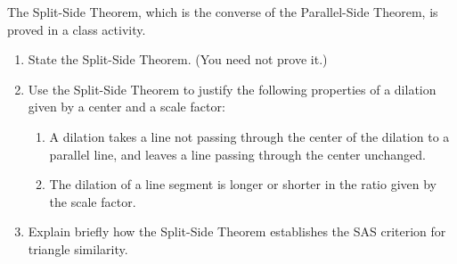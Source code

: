 \begin{prob}
The Split-Side Theorem, which is the converse of the Parallel-Side Theorem, is proved in a class activity.   
\begin{enumerate}
\item State the Split-Side Theorem.   (You need not prove it.)
\item Use the Split-Side Theorem to justify the following properties of a dilation given by a center and a scale factor:
\begin{enumerate}
\item A dilation takes a line not passing through the center of the dilation to a parallel line, and leaves a line passing through the center unchanged.
\item The dilation of a line segment is longer or shorter in the ratio given by the scale factor.
\end{enumerate}
\item Explain briefly how the Split-Side Theorem establishes the SAS criterion for triangle similarity.  
\end{enumerate}
\end{prob}
%
%


